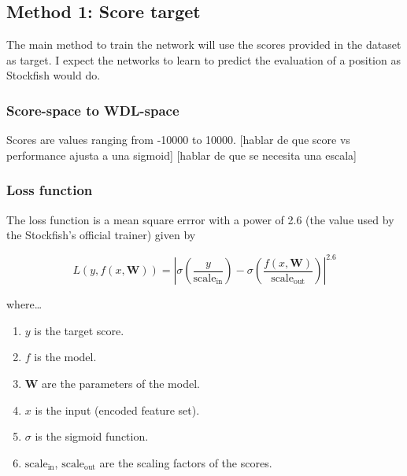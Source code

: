 

\subsection{Method 1: Score target}

The main method to train the network will use the scores provided in the dataset as target. I expect the networks to learn to predict the evaluation of a position as Stockfish would do.

\setcounter{secnumdepth}{4}
\subsubsection{Score-space to WDL-space}

Scores are values ranging from -10000 to 10000. [hablar de que score vs performance ajusta a una sigmoid]
[hablar de que se necesita una escala]


\subsubsection{Loss function}

The loss function is a mean square errror with a power of 2.6 (the value used by the Stockfish's official trainer) given by


\[
L(y,f(x,\bm{W}))= \left| \sigma\left(\frac{y}{\text{scale}_{\text{in}}}\right) - \sigma\left(\frac{f(x,\bm{W})}{\text{scale}_{\text{out}}}\right) \right| ^{2.6}
\]


where\dots

\begin{enumerate}
\itemsep0em
\item $y$ is the target score.
\item $f$ is the model.
\item $\bm{W}$ are the parameters of the model.
\item $x$ is the input (encoded feature set).
\item $\sigma$ is the sigmoid function.
\item $\text{scale}_{\text{in}}$, $\text{scale}_{\text{out}}$ are the scaling factors of the scores.
\end{enumerate}

